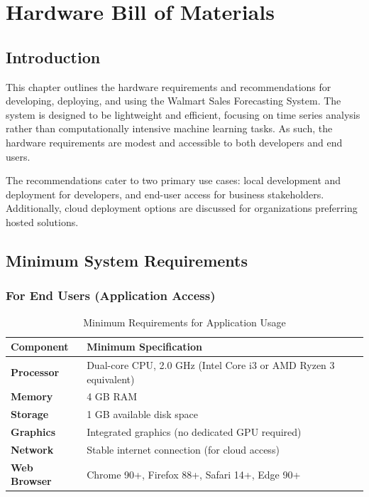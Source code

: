 %
%
%

\chapter{Hardware Bill of Materials}

\section*{Introduction}

This chapter outlines the hardware requirements and recommendations for developing, deploying, and using the Walmart Sales Forecasting System. The system is designed to be lightweight and efficient, focusing on time series analysis rather than computationally intensive machine learning tasks. As such, the hardware requirements are modest and accessible to both developers and end users.

The recommendations cater to two primary use cases: local development and deployment for developers, and end-user access for business stakeholders. Additionally, cloud deployment options are discussed for organizations preferring hosted solutions.

\section*{Minimum System Requirements}

\subsection*{For End Users (Application Access)}

\begin{table}[H]
	\centering
	\caption{Minimum Requirements for Application Usage}
	\begin{tabular}{|p{3cm}|p{10cm}|}
		\hline
		\textbf{Component} & \textbf{Minimum Specification} \\
		\hline
		\textbf{Processor} & Dual-core CPU, 2.0 GHz (Intel Core i3 or AMD Ryzen 3 equivalent) \\
		\hline
		\textbf{Memory} & 4 GB RAM \\
		\hline
		\textbf{Storage} & 1 GB available disk space \\
		\hline
		\textbf{Graphics} & Integrated graphics (no dedicated GPU required) \\
		\hline
		\textbf{Network} & Stable internet connection (for cloud access) \\
		\hline
		\textbf{Web Browser} & Chrome 90+, Firefox 88+, Safari 14+, Edge 90+ \\
		\hline
	\end{tabular}
	\label{tab:min-requirements}
\end{table}

